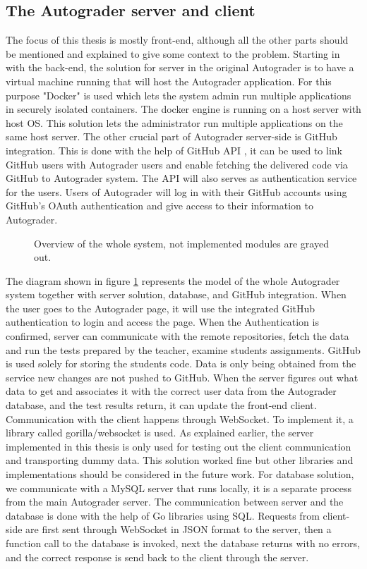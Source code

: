 \subsection{The Autograder server and client}
The focus of this thesis is mostly front-end, although all the other parts should be mentioned and explained to give some context to the problem. Starting in with the back-end, the solution for server in the original Autograder is to have a virtual machine running that will host the Autograder application. For this purpose "Docker" \cite{docker} is used which lets the system admin run multiple applications in securely isolated containers. The docker engine is running on a host server with host OS. This solution lets the administrator run multiple applications on the same host server. The other crucial part of Autograder server-side is GitHub integration. This is done with the help of GitHub API \cite{githubAPI}, it can be used to link GitHub users with Autograder users and enable fetching the delivered code via GitHub to Autograder system. The API will also serves as authentication service for the users. Users of Autograder will log in with their GitHub accounts using GitHub's OAuth authentication \cite{githuboauth} and give access to their information to Autograder.

\begin{figure}[h]
  \scalebox{1}{}
  \caption{Overview of the whole system, not implemented modules are grayed out.}
  \label{fig:systemoverview}
\end{figure}

The diagram shown in figure \ref{fig:systemoverview} represents the model of the whole Autograder system together with server solution, database, and GitHub integration. When the user goes to the Autograder page, it will use the integrated GitHub authentication to login and access the page. When the Authentication is confirmed, server can communicate with the remote repositories, fetch the data and run the tests prepared by the teacher, examine students assignments. GitHub is used solely for storing the students code. Data is only being obtained from the service new changes are not pushed to GitHub. When the server figures out what data to get and associates it with the correct user data from the Autograder database, and the test results return, it can update the front-end client.
\\Communication with the client happens through WebSocket. To implement it, a library called gorilla/websocket \cite{gorilla} is used. As explained earlier, the server implemented in this thesis is only used for testing out the client communication and transporting dummy data. This solution worked fine but other libraries and implementations should be considered in the future work. For database solution, we communicate with a MySQL server that runs locally, it is a separate process from the main Autograder server. The communication between server and the database is done with the help of Go libraries using SQL. Requests from client-side are first sent through WebSocket in JSON format to the server, then a function call to the database is invoked, next the database returns with no errors, and the correct response is send back to the client through the server.  

